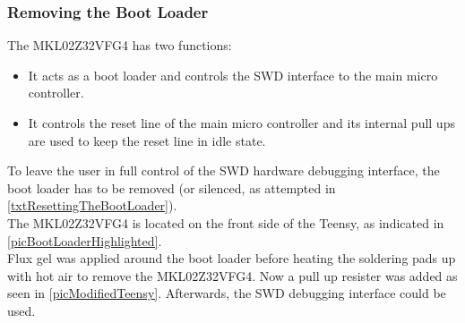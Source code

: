 \subsubsection{Removing the Boot Loader} \label{txtRemovingTheBootLoader}
The MKL02Z32VFG4 has two functions:
\begin{itemize}
    \item It acts as a boot loader and controls the SWD interface to the main micro controller.
    \item It controls the reset line of the main micro controller and its internal pull ups are used to keep the reset line in idle state.
\end{itemize}
To leave the user in full control of the SWD hardware debugging interface, the boot loader has to be removed (or silenced, as attempted in \ref{txtResettingTheBootLoader}). \\
The MKL02Z32VFG4 is located on the front side of the Teensy, as indicated in \autoref{picBootLoaderHighlighted}.\\
Flux gel was applied around the boot loader before heating the soldering pads up with hot air to remove the MKL02Z32VFG4. Now a pull up resister was added as seen in \autoref{picModifiedTeensy}. Afterwards, the SWD debugging interface could be used. \\
%
%
%
%
%
%
